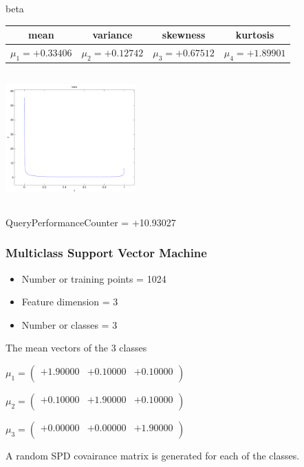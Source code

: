 \documentclass[9pt]{article}
\theoremstyle{plain}
\theoremstyle{definition}
\theoremstyle{remark}
\numberwithin{equation}{section}
\begin{document}
\newpage
beta \begin{tabular}{|c|c|c|c|}  mean & variance & skewness & kurtosis \\  \hline
$\mu_1 = +0.33406$ & $\mu_2 = +0.12742$ & $\mu_3 = +0.67512$ & $\mu_4 =+1.89901$ \\
\end{tabular}

\includegraphics[width=5cm,height=5cm]{beta.pdf}

QueryPerformanceCounter  =  +10.93027
\subsubsection{Multiclass Support Vector Machine }
\begin{itemize}
\item Number or training points = 1024
\item Feature dimension = 3
\item Number or classes = 3
\end{itemize}
{The mean vectors of the 3 classes}

$\mu_1 = \left(
\begin{array}{
ccc}
+1.90000 & +0.10000 & +0.10000 \\
\end{array}
\right)$ \newline 

$\mu_2 = \left(
\begin{array}{
ccc}
+0.10000 & +1.90000 & +0.10000 \\
\end{array}
\right)$ \newline 

$\mu_3 = \left(
\begin{array}{
ccc}
+0.00000 & +0.00000 & +1.90000 \\
\end{array}
\right)$ \newline 

A random SPD covairance matrix is generated for each of the classes.\newline
\end{document}

